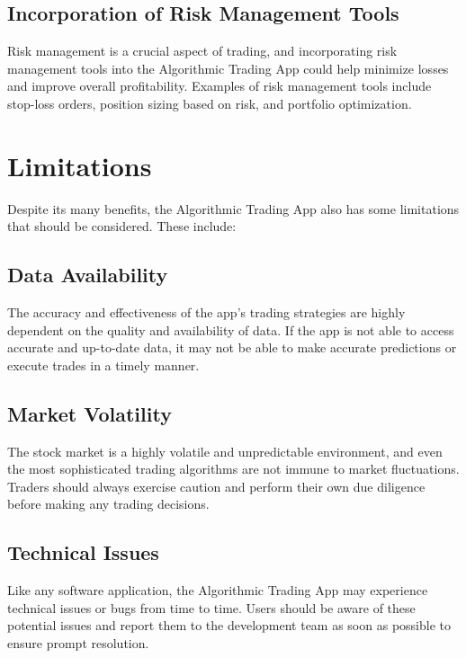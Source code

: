 \subsection{Incorporation of Risk Management Tools}

Risk management is a crucial aspect of trading, and incorporating risk management tools into the Algorithmic Trading App could help minimize losses and improve overall profitability. Examples of risk management tools include stop-loss orders, position sizing based on risk, and portfolio optimization.

\section{Limitations}

Despite its many benefits, the Algorithmic Trading App also has some limitations that should be considered. These include:

\subsection{Data Availability}

The accuracy and effectiveness of the app's trading strategies are highly dependent on the quality and availability of data. If the app is not able to access accurate and up-to-date data, it may not be able to make accurate predictions or execute trades in a timely manner.

\subsection{Market Volatility}

The stock market is a highly volatile and unpredictable environment, and even the most sophisticated trading algorithms are not immune to market fluctuations. Traders should always exercise caution and perform their own due diligence before making any trading decisions.

\subsection{Technical Issues}

Like any software application, the Algorithmic Trading App may experience technical issues or bugs from time to time. Users should be aware of these potential issues and report them to the development team as soon as possible to ensure prompt resolution.